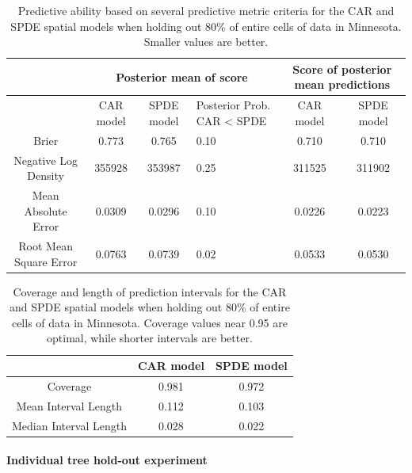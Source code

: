\documentclass[12pt]{article}
\providecommand{\tabularnewline}{\\}
\begin{document}
\begin{table}
\caption{Predictive ability based on several predictive metric criteria for
the CAR and SPDE spatial models when holding out 80\% of entire cells
of data in Minnesota. Smaller values are better.}


\begin{tabular}{|c|c|c|>{\centering}p{3cm}|c|c|}
\hline 
 &
\multicolumn{3}{c|}{{\small{}Posterior mean of score}} &
\multicolumn{2}{c|}{{\small{}Score of posterior mean predictions}}\tabularnewline
\hline 
\hline 
 &
{\small{}CAR model} &
{\small{}SPDE model} &
{\small{}Posterior Prob. CAR < SPDE} &
{\small{}CAR model} &
{\small{}SPDE model}\tabularnewline
\hline 
{\small{}Brier} &
{\small{}0.773} &
{\small{}0.765} &
{\small{}0.10} &
{\small{}0.710} &
{\small{}0.710}\tabularnewline
\hline 
{\small{}Negative Log Density} &
{\small{}355928} &
{\small{}353987} &
{\small{}0.25} &
{\small{}311525} &
{\small{}311902}\tabularnewline
\hline 
{\small{}Mean Absolute Error} &
{\small{}0.0309} &
{\small{}0.0296} &
{\small{}0.10} &
{\small{}0.0226} &
{\small{}0.0223}\tabularnewline
\hline 
{\small{}Root Mean Square Error} &
{\small{}0.0763} &
{\small{}0.0739} &
{\small{}0.02} &
{\small{}0.0533} &
{\small{}0.0530}\tabularnewline
\hline 
\end{tabular}

\label{tab:score_cell_20percent}
\end{table}


\begin{table}
\caption{Coverage and length of prediction intervals for the CAR and SPDE spatial
models when holding out 80\% of entire cells of data in Minnesota.
Coverage values near 0.95 are optimal, while shorter intervals are
better.}


\begin{tabular}{|c|c|c|}
\hline 
 &
{\small{}CAR model} &
{\small{}SPDE model}\tabularnewline
\hline 
{\small{}Coverage} &
{\small{}0.981} &
{\small{}0.972}\tabularnewline
\hline 
{\small{}Mean Interval Length} &
{\small{}0.112} &
{\small{}0.103}\tabularnewline
\hline 
{\small{}Median Interval Length} &
{\small{}0.028} &
{\small{}0.022}\tabularnewline
\hline 
\end{tabular}

\label{tab:coverage_cell_20percent}
\end{table}



\paragraph{Individual tree hold-out experiment}
\end{document}
